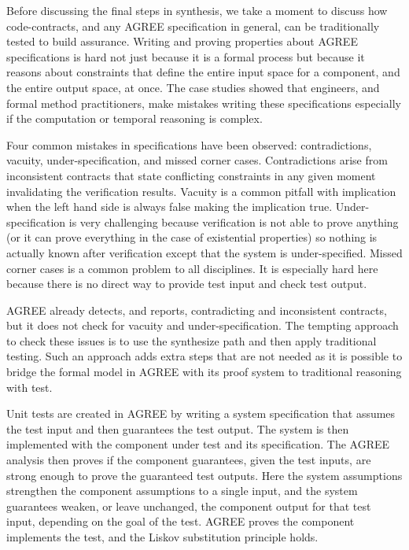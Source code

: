 Before discussing the final steps in synthesis, we take a moment to discuss how code-contracts, and any AGREE specification in general, can be traditionally tested to build assurance.
Writing and proving properties about AGREE specifications is hard not just because it is a formal process but  because it reasons about constraints that define the entire input space for a component, and the entire output space, at once.
The case studies showed that engineers, and formal method practitioners, make mistakes writing these specifications especially if the computation or temporal reasoning is complex.

Four common mistakes in specifications have been observed: contradictions, vacuity, under-specification, and missed corner cases.
Contradictions arise from inconsistent contracts that state conflicting constraints in any given moment invalidating the verification results.
Vacuity is a common pitfall with implication when the left hand side is always false making the implication true. 
Under-specification is very challenging because verification is not able to prove anything (or it can prove everything in the case of existential properties) so nothing is actually known after verification except that the system is under-specified. 
Missed corner cases is a common problem to all disciplines.
It is especially hard here because there is no direct way to provide test input and check test output.

AGREE already detects, and reports, contradicting and inconsistent contracts, but it does not check for vacuity and under-specification.
The tempting approach to check these issues is to use the synthesize path and then apply traditional testing.
Such an approach adds extra steps that are not needed as it is possible to bridge the formal model in AGREE with its proof system to traditional reasoning with test.

Unit tests are created in AGREE by writing a system specification that assumes the test input and then guarantees the test output.
The system is then implemented with the component under test and its specification.
The AGREE analysis then proves if the component guarantees, given the test inputs, are strong enough to prove the guaranteed test outputs.
Here the system assumptions strengthen the component assumptions to a single input, and the system guarantees weaken, or leave unchanged, the component output for that test input, depending on the goal of the test.
AGREE proves the component implements the test, and the Liskov substitution principle holds.


